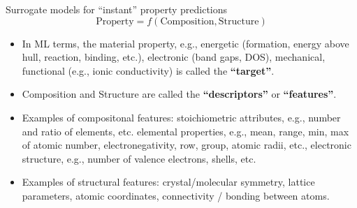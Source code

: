 \documentclass[aspectratio=169]{beamer}
\begin{document}
\begin{frame}{Surrogate models for “instant” property predictions}
    \begin{equation*}
        \mathrm{Property} = f(\mathrm{Composition}, \mathrm{Structure})
    \end{equation*}
    \begin{itemize}
        \item In ML terms, the material property, e.g., energetic (formation, energy above hull, reaction, binding, etc.), electronic (band gaps, DOS), mechanical, functional (e.g., ionic conductivity) is called the \textbf{``target''}.
        \item Composition and Structure are called the \textbf{``descriptors''} or \textbf{``features''}.
        \item Examples of compositonal features: stoichiometric attributes, e.g., number and ratio of elements, etc. elemental properties, e.g., mean, range, min, max of atomic number, electronegativity, row, group, atomic radii, etc., electronic structure, e.g., number of valence electrons, shells, etc. 
        \item Examples of structural features: crystal/molecular symmetry, lattice parameters, atomic coordinates, connectivity / bonding between atoms.
    \end{itemize}
\end{frame}
\end{document}
